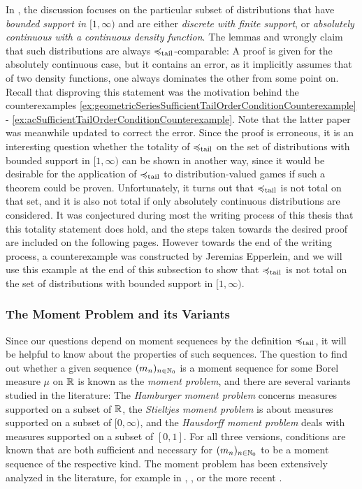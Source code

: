 \documentclass[a4paper,DIV=11,abstracton,twoside=semi]{scrreprt}
\theoremstyle{definition}
\begin{document}
    In \cite{bib:rassGameRiskManagI,bib:rassTotalOrderingOnLossDistributions}, the discussion focuses on the particular subset of distributions that have \emph{bounded support in $[1, \infty)$} and are either \emph{discrete with finite support}, or \emph{absolutely continuous with a continuous density function}.
    The lemmas \cite[Lemma 2]{bib:rassTotalOrderingOnLossDistributions} and \cite[Lemma 2.4]{bib:rassGameRiskManagI} wrongly claim that such distributions are always $\preccurlyeq_{\text{tail}}$-comparable: A proof is given for the absolutely continuous case, but it contains an error, as it implicitly assumes that of two density functions, one always dominates the other from some point on. Recall that disproving this statement was the motivation behind the counterexamples \ref{ex:geometricSeriesSufficientTailOrderConditionCounterexample} - \ref{ex:acSufficientTailOrderConditionCounterexample}. Note that the latter paper was meanwhile updated to correct the error.
    Since the proof is erroneous, it is an interesting question whether the totality of $\preccurlyeq_{\text{tail}}$ on the set of distributions with bounded support in $[1, \infty)$ can be shown in another way, since it would be desirable for the application of $\preccurlyeq_{\text{tail}}$ to distribution-valued games if such a theorem could be proven.
    Unfortunately, it turns out that $\preccurlyeq_{\text{tail}}$ is not total on that set, and it is also not total if only absolutely continuous distributions are considered.
    It was conjectured during most the writing process of this thesis that this totality statement does hold, and the steps taken towards the desired proof are included on the following pages. However towards the end of the writing process, a counterexample was constructed by Jeremias Epperlein, and we will use this example at the end of this subsection to show that $\preccurlyeq_{\text{tail}}$ is not total on the set of distributions with bounded support in $[1, \infty)$.
    
    \subsubsection{The Moment Problem and its Variants}
    Since our questions depend on moment sequences by the definition $\preccurlyeq_{\text{tail}}$, it will be helpful to know about the properties of such sequences.
    The question to find out whether a given sequence $(m_n)_{n \in \mathbb{N}_0}$ is a moment sequence for some Borel measure $\mu$ on $\mathbb{R}$ is known as the \emph{moment problem}, and there are several variants studied in the literature:
    The \emph{Hamburger moment problem} concerns measures supported on a subset of $\mathbb{R}$, the \emph{Stieltjes moment problem} is about measures supported on a subset of $[0, \infty)$,
    and the \emph{Hausdorff moment problem} deals with measures supported on a subset of $[0, 1]$. For all three versions, conditions are known that are both sufficient and necessary for $(m_n)_{n \in \mathbb{N}_0}$ to be a moment sequence of the respective kind.
    The moment problem has been extensively analyzed in the literature, for example in \cite{bib:shohatTheProblemOfMoments}, \cite{bib:akhiezerClassicalMomentProblem}, or the more recent \cite{bib:schmuedgenTheMomentProblem}.
\end{document}
